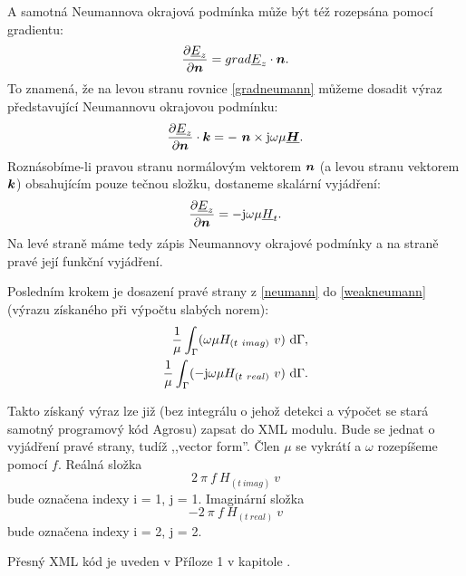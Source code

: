\documentclass[12pt,a4paper,oneside]{article}
\numberwithin{equation}{section} %
\numberwithin{figure}{section} %
\numberwithin{table}{section} %
\newcommand{\mj}{\mathrm{j}} %
\renewcommand{\vec}[1]{\mbox{\boldmath$#1$}} %
\newcommand{\faz}[1]{{\underline{#1}}} %
\begin{document}
A samotná Neumannova okrajová podmínka může být též rozepsána pomocí gradientu:
\begin{equation}
\label{gradneumann}
\frac{\partial \faz{E}_z}{\partial \vec{n}} = grad \faz{E}_z \cdot \vec{n} .
\end{equation}
To znamená, že na levou stranu rovnice \ref{gradneumann} můžeme dosadit výraz představující Neumannovu okrajovou podmínku:
\begin{equation}
\label{NeumannEKvek}
\frac{\partial \faz{E}_z}{\partial \vec{n}} \cdot \vec{k} = - ~ \vec{n} \times \mj \omega \mu \faz{\vec{H}}.
\end{equation}
Roznásobíme-li pravou stranu normálovým vektorem $\vec{n}$ (a levou stranu vektorem $\vec{k}$) obsahujícím pouze tečnou složku, dostaneme skalární vyjádření:
\begin{equation}
\label{neumann}
\frac{\partial \faz{E}_z}{\partial \vec{n}} = - \mj \omega \mu \faz{H}_t .
\end{equation}
Na levé straně máme tedy zápis Neumannovy okrajové podmínky a na straně pravé její funkční vyjádření.

Posledním krokem je dosazení pravé strany z \ref{neumann} do \ref{weakneumann} (výrazu získaného při výpočtu slabých norem):
\begin{subequations}
\begin{align}
\frac{1}{\mu} \int _{\Gamma} ( \omega \mu H_{(t~imag)} ~ v ) ~ \ud \Gamma ,
\\ 
\frac{1}{\mu} \int _{\Gamma} ( - \mj \omega \mu H_{(t~real)} ~ v ) ~ \ud \Gamma .
\end{align}
\end{subequations}

Takto získaný výraz lze již (bez integrálu o jehož detekci a výpočet se stará samotný programový kód Agrosu) zapsat do XML modulu. Bude se jednat o vyjádření pravé strany, tudíž ,,vector form''. Člen $\mu$ se vykrátí a $\omega$ rozepíšeme pomocí $f$. Reálná složka 
\begin{equation}
2 ~ \pi ~ f ~ H_{(t~imag)} ~ v
\end{equation} 
bude označena indexy i = 1, j = 1. Imaginární složka 
\begin{equation}
- 2 ~ \pi ~ f ~ H_{(t~real)} ~ v
\end{equation}
bude označena indexy i = 2, j = 2.

Přesný XML kód je uveden v Příloze 1 v kapitole .
\end{document}
